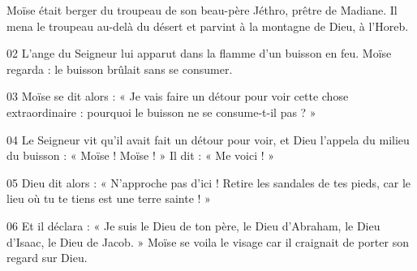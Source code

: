 Moïse était berger du troupeau de son beau-père Jéthro, prêtre de Madiane. Il mena le troupeau au-delà du désert et parvint à la montagne de Dieu, à l’Horeb.

02 L’ange du Seigneur lui apparut dans la flamme d’un buisson en feu. Moïse regarda : le buisson brûlait sans se consumer.

03 Moïse se dit alors : « Je vais faire un détour pour voir cette chose extraordinaire : pourquoi le buisson ne se consume-t-il pas ? »

04 Le Seigneur vit qu’il avait fait un détour pour voir, et Dieu l’appela du milieu du buisson : « Moïse ! Moïse ! » Il dit : « Me voici ! »

05 Dieu dit alors : « N’approche pas d’ici ! Retire les sandales de tes pieds, car le lieu où tu te tiens est une terre sainte ! »

06 Et il déclara : « Je suis le Dieu de ton père, le Dieu d’Abraham, le Dieu d’Isaac, le Dieu de Jacob. » Moïse se voila le visage car il craignait de porter son regard sur Dieu.